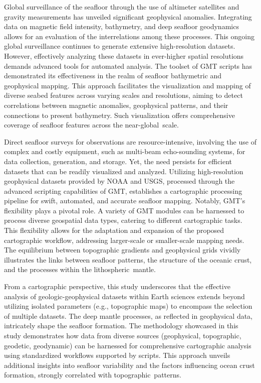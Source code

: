 \documentclass[geomatics,article,accept,pdftex,moreauthors]{Definitions/mdpi}
\begin{document}
Global surveillance of the seafloor through the use of altimeter satellites and gravity measurements has unveiled significant geophysical anomalies. Integrating data on magnetic field intensity, bathymetry, and deep seafloor geodynamics allows for an evaluation of the interrelations among these processes. This ongoing global surveillance continues to generate extensive high-resolution datasets. However, effectively analyzing these datasets in ever-higher spatial resolutions demands advanced tools for automated analysis. The toolset of GMT scripts has demonstrated its effectiveness in the realm of seafloor bathymetric and geophysical mapping. This approach facilitates the visualization and mapping of diverse seabed features across varying scales and resolutions, aiming to detect correlations between magnetic anomalies, geophysical patterns, and their connections to present bathymetry. Such visualization offers comprehensive coverage of seafloor features across the near-global~scale.

Direct seafloor surveys for observations are resource-intensive, involving the use of complex and costly equipment, such as multi-beam echo-sounding systems, for data collection, generation, and storage. Yet, the need persists for efficient datasets that can be readily visualized and analyzed. Utilizing high-resolution geophysical datasets provided by NOAA and USGS, processed through the advanced scripting capabilities of GMT, establishes a cartographic processing pipeline for swift, automated, and accurate seafloor mapping. Notably, GMT's flexibility plays a pivotal role. A variety of GMT modules can be harnessed to process diverse geospatial data types, catering to different cartographic tasks. This flexibility allows for the adaptation and expansion of the proposed cartographic workflow, addressing larger-scale or smaller-scale mapping needs. The equilibrium between topographic gradients and geophysical grids vividly illustrates the links between seafloor patterns, the structure of the oceanic crust, and the processes within the lithospheric~mantle.

From a cartographic perspective, this study underscores that the effective analysis of geologic-geophysical datasets within Earth sciences extends beyond utilizing isolated parameters (e.g., topographic maps) to encompass the selection of multiple datasets. The deep mantle processes, as reflected in geophysical data, intricately shape the seafloor formation. The methodology showcased in this study demonstrates how data from diverse sources (geophysical, topographic, geodetic, geodynamic) can be harnessed for comprehensive cartographic analysis using standardized workflows supported by scripts. This approach unveils additional insights into seafloor variability and the factors influencing ocean crust formation, strongly correlated with topographic~patterns.
\end{document}

